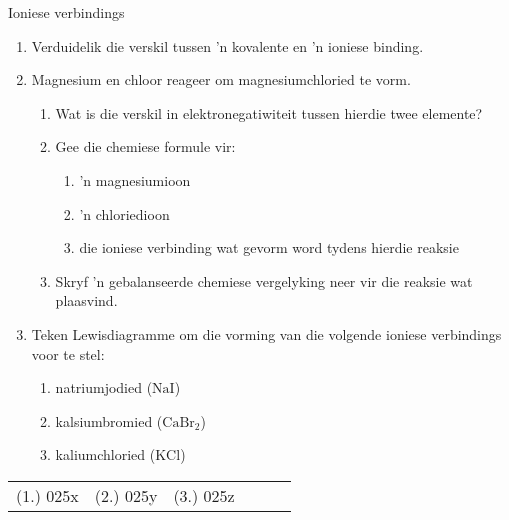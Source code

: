\begin{exercises}{Ioniese verbindings}
{
            \nopagebreak
        \label{m38684*id142562}\begin{enumerate}[noitemsep, label=\textbf{\arabic*}. ] 
            \label{m38684*uid57}\item Verduidelik die verskil tussen 'n kovalente en 'n ioniese binding.\newline
\label{m38684*uid58}\item Magnesium en chloor reageer om magnesiumchloried te vorm.
\label{m38684*id142602}\begin{enumerate}[noitemsep, label=\textbf{\alph*}. ] 
            \label{m38684*uid59}\item Wat is die verskil in elektronegatiwiteit tussen hierdie twee elemente?
\label{m38684*uid60}\item Gee die chemiese formule vir:
\label{m38684*id142630}\begin{enumerate}[noitemsep, label=\textbf{\roman*}. ] 
            \label{m38684*uid61}\item 'n magnesiumioon
\label{m38684*uid62}\item 'n chloriedioon
\label{m38684*uid63}\item die ioniese verbinding wat gevorm word tydens hierdie reaksie
\end{enumerate}
        \label{m38684*uid64}\item Skryf 'n gebalanseerde chemiese vergelyking neer vir die reaksie wat plaasvind.
\end{enumerate}
        \label{m38684*uid65}\item Teken Lewisdiagramme om die vorming van die volgende ioniese verbindings voor te stel:
\label{m38684*id142697}\begin{enumerate}[noitemsep, label=\textbf{\alph*}. ] 
            \label{m38684*uid66}\item natriumjodied  ($\text{NaI}$)
\label{m38684*uid67}\item kalsiumbromied ($\text{CaBr}{}_{2}$)
\label{m38684*uid68}\item kaliumchloried ($\text{KCl}$)

\end{enumerate}
        \end{enumerate}

\practiceinfo
\begin{tabular}[h]{cccccc}
 (1.) 025x  &  (2.) 025y  &  (3.) 025z  &
\end{tabular}
}
\end{exercises}

